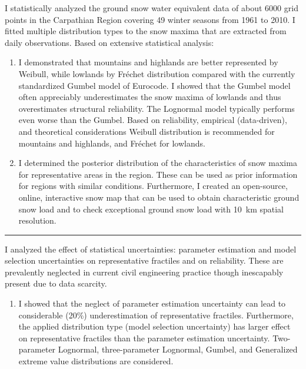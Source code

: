 \begin{enumerate}[leftmargin=*, align=left]

  \item[]
  I statistically analyzed the ground snow water equivalent data of about 6000 grid points in the Carpathian Region covering 49 winter seasons from 1961 to 2010. I fitted multiple distribution types to the snow maxima that are extracted from daily observations. Based on extensive statistical analysis:
  \begin{enumerate}[leftmargin=*, align=left]
    \item[\textbf{I/a}] I demonstrated that mountains and highlands are better represented by Weibull, while lowlands by Fréchet distribution compared with the currently standardized Gumbel model of Eurocode. I showed that the Gumbel model often appreciably underestimates the snow maxima of lowlands and thus overestimates structural reliability. The Lognormal model typically performs even worse than the Gumbel. Based on reliability, empirical (data-driven), and theoretical considerations Weibull distribution is recommended for mountains and highlands, and Fréchet for lowlands.
    
    \item[\textbf{I/b}] I determined the posterior distribution of the characteristics of snow maxima for representative areas in the region. These can be used as prior information for regions with similar conditions. Furthermore, I created an open-source, online, interactive snow map that can be used to obtain characteristic ground snow load and to check exceptional ground snow load with 10~km spatial resolution. 
  \end{enumerate}
  
  \citep{RozsasAMM2016, RozsasESREL2015, VighTO2016, RozsasIABSE2015}
  
 
 \begin{center}
  \noindent\rule[0.5ex]{0.5\linewidth}{0.5pt}
  \item[\textbf{Thesis II}] \hfill
 \end{center}
  I analyzed the effect of statistical uncertainties: parameter estimation and model selection uncertainties on representative fractiles and on reliability. These are prevalently neglected in current civil engineering practice though inescapably present due to data scarcity.
  \begin{enumerate}[leftmargin=*, align=left]
    \item[\textbf{II/a}] I showed that the neglect of parameter estimation uncertainty can lead to considerable (20\%) underestimation of representative fractiles. Furthermore, the applied distribution type (model selection uncertainty) has larger effect on representative fractiles than the parameter estimation uncertainty. Two-parameter Lognormal, three-parameter Lognormal, Gumbel, and Generalized extreme value distributions are considered.
    

\end{enumerate}
\end{enumerate}
